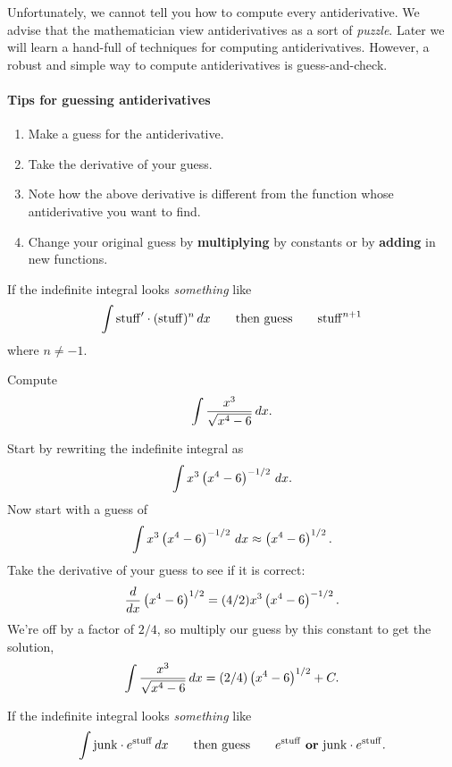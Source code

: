 \documentclass{ximera}
\begin{document}
Unfortunately, we cannot tell you how to compute every antiderivative.
We advise that the mathematician view antiderivatives as a sort of
\textit{puzzle}. Later we will learn a hand-full of techniques for
computing antiderivatives. However, a robust and simple way to compute
antiderivatives is guess-and-check.


\paragraph{Tips for guessing antiderivatives}
\begin{enumerate}
\item Make a guess for the antiderivative.
\item Take the derivative of your guess.
\item Note how the above derivative is different from the function
  whose antiderivative you want to find.
\item Change your original guess by \textbf{multiplying} by constants
  or by \textbf{adding} in new functions.
\end{enumerate}

\begin{template}\label{template:powerchain}
If the indefinite integral looks \emph{something} like
\[
\int \mathrm{stuff}' \cdot (\mathrm{stuff})^n \,d x \qquad\text{then guess} \qquad \mathrm{stuff}^{n+1}
\]
where $n\ne -1$.
\end{template}

\begin{example} Compute
\[
\int \frac{x^3}{\sqrt{x^4 -6}} \,d x.
\]


Start by rewriting the indefinite integral as
\[
\int x^3\left(x^4 -6\right)^{-1/2} \,d x.
\]
Now start with a guess of 
\[
\int x^3\left(x^4 -6\right)^{-1/2} \,d x \approx \left(x^4 -6\right)^{1/2}.
\]
Take the derivative of your guess to see if it is correct:
\[
\frac{d}{dx}  \left(x^4 -6\right)^{1/2} = (4/2)x^3\left(x^4 -6\right)^{-1/2}.
\]
We're off by a factor of $2/4$, so multiply our guess by this constant
to get the solution,
\[
\int \frac{x^3}{\sqrt{x^4 -6}} \,d x = (2/4)\left(x^4 -6\right)^{1/2}+C.
\]
\end{example}


\begin{template}\label{template:echain}
If the indefinite integral looks \emph{something} like
\[
\int \mathrm{junk}\cdot e^{\mathrm{stuff}} \,d x \qquad\text{then
  guess}\qquad e^{\mathrm{stuff}} \text{ \textbf{or} }\mathrm{junk}
\cdot e^{\mathrm{stuff}}.
\]
\end{template}
\end{document}

